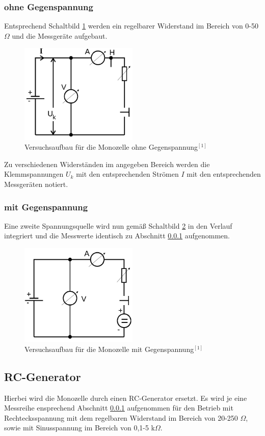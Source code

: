 \subsubsection{ohne Gegenspannung}
\label{sec_ogegen}
Entsprechend Schaltbild \ref{pic_ogegenspannung} werden ein regelbarer Widerstand im Bereich von 0-50 $\Omega$ und die Messgeräte aufgebaut.
\begin{figure}[H]
 \includegraphics[width=0.5\textwidth]{pics/ohne.png}
 \caption{Versuchsaufbau für die Monozelle ohne Gegenspannung$^{[1]}$}
 \label{pic_ogegenspannung}
\end{figure}
Zu verschiedenen Widerständen im angegeben Bereich werden die Klemmspannungen $U_k$ mit den entsprechenden Strömen $I$ mit den entsprechenden
Messgeräten notiert.
\subsubsection{mit Gegenspannung}
Eine zweite Spannungsquelle wird nun gemäß Schaltbild \ref{pic_mgegenspannung} in den Verlauf integriert und die Messwerte identisch zu Abschnitt
\ref{sec_ogegen} aufgenommen.
\begin{figure}[H]
 \includegraphics[width=0.5\textwidth]{pics/mit.png}
 \caption{Versuchsaufbau für die Monozelle mit Gegenspannung$^{[1]}$}
 \label{pic_mgegenspannung}
\end{figure}
\subsection{RC-Generator}
Hierbei wird die Monozelle durch einen RC-Generator ersetzt. Es wird je eine Messreihe ensprechend Abschnitt \ref{sec_ogegen} aufgenommen
für den Betrieb mit Rechtecksspannung mit dem regelbaren Widerstand im Bereich von 20-250 $\Omega$, sowie mit Sinusspannung im Bereich von
0,1-5 k$\Omega$.
